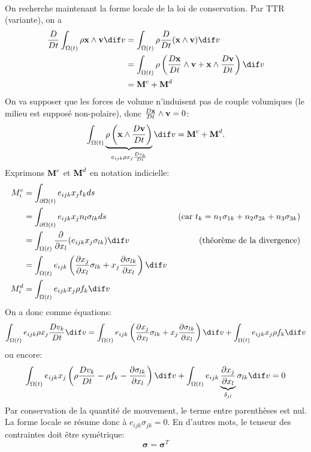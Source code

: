 \paragraph{}
On recherche maintenant la forme locale de la loi de conservation. Par TTR (variante), on a
$$\begin{aligned}
\frac{D}{Dt}\int_{\Omega (t)}\rho\fv{x}\wedge\fv{v} \dif v &=\int_{\Omega (t)}\rho\frac{D}{Dt}(\fv{x}\wedge\fv{v}) \dif v\\
 &=\int_{\Omega (t)}\rho \left(\frac{D\fv{x}}{Dt}\wedge\fv{v}+\fv{x}\wedge\frac{D\fv{v}}{Dt}\right) \dif v\\
  & =\fv{M}^c+\fv{M}^d\\
\end{aligned}$$
On va supposer que les forces de volume  n'induisent pas de couple volumiques (le milieu est supposé non-polaire), donc $\frac{D\textbf{x}}{Dt}\wedge\textbf{v}=0$:
$$\int_{\Omega (t)}\underbrace{\rho \left(\fv{x}\wedge\frac{D\fv{v}}{Dt}\right)}_{e_{ijk}\rho x_j\frac{Dv_k}{Dt}} \dif v=\fv{M}^c+\fv{M}^d.$$
Exprimons $\textbf{M}^c$ et $\textbf{M}^d$ en notation indicielle:
$$\begin{aligned}
M_i^c&=\int_{\partial\Omega (t)}e_{ijk}x_jt_kds\\
 & =\int_{\partial\Omega (t)}e_{ijk}x_jn_l\sigma_{lk}ds & \text{  (car } t_k=n_1\sigma_{1k}+n_2\sigma_{2k}+n_3\sigma_{3k}\text{)}\\
 &=\int_{\Omega (t)}\frac{\partial}{\partial x_l}(e_{ijk}x_j\sigma_{lk}) \dif v& \text{(théorème de la divergence)}\\
 &=\int_{\Omega (t)}e_{ijk}\left(\frac{\partial x_j}{\partial x_l}\sigma_{lk}+x_j\frac{\partial\sigma_{lk}}{\partial x_l}\right) \dif v\\
 M_i^d&=\int_{\Omega (t)}e_{ijk}x_j\rho f_k \dif v
\end{aligned}$$
On a donc comme équations:
$$\int_{\Omega (t)}e_{ijk}\rho x_j\frac{Dv_k}{Dt} \dif v=\int_{\Omega (t)}e_{ijk}\left(\frac{\partial x_j}{\partial x_l}\sigma_{lk}+x_j\frac{\partial\sigma_{lk}}{\partial x_l}\right) \dif v+\int_{\Omega (t)}e_{ijk}x_j\rho f_k \dif v$$
ou encore:
$$\int_{\Omega (t)}e_{ijk}x_j\left(\rho\frac{Dv_k}{Dt}-\rho f_k-\frac{\partial \sigma_{lk}}{\partial x_l}\right) \dif v+\int_{\Omega (t)}e_{ijk}\underbrace{\frac{\partial x_j}{\partial x_l}}_{\delta_{jl}}\sigma_{lk} \dif v=0$$
Par conservation de la quantité de mouvement, le terme entre parenthèses est nul. La forme locale se résume donc à $e_{ijk}\sigma_{jk}=0$. En d'autres mots, le tenseur des contraintes doit être symétrique:
$$\boxed{\boldsymbol{\sigma}=\boldsymbol{\sigma}^T}$$

